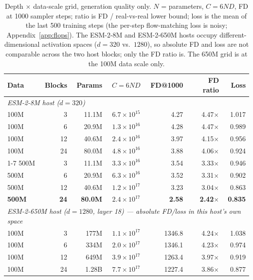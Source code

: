 \documentclass{article}
\begin{document}
\begin{table}[t]
\centering
\caption{Depth $\times$ data-scale grid, generation quality only. $N$ = parameters,
$C = 6ND$, FD at 1000 sampler steps; ratio is FD / real-vs-real lower bound; loss is the
mean of the last 500 training steps (the per-step flow-matching loss is noisy;
Appendix~\ref{app:flops}). The ESM-2-8M and ESM-2-650M hosts occupy different-dimensional
activation spaces ($d{=}320$ vs.\ $1280$), so absolute FD and loss are not comparable across
the two host blocks; only the FD ratio is. The 650M grid is at the 100M data scale only.}
\label{tab:scaling}
\begin{tabular}{lrrrrrr}
\toprule
Data & Blocks & Params & $C = 6ND$ & FD@1000 & FD ratio & Loss \\
\midrule
\multicolumn{7}{l}{\emph{ESM-2-8M host ($d{=}320$)}} \\
100M & 3  & 11.1M & $6.7{\times}10^{15}$ & 4.27 & 4.47$\times$ & 1.017 \\
100M & 6  & 20.9M & $1.3{\times}10^{16}$ & 4.28 & 4.47$\times$ & 0.989 \\
100M & 12 & 40.6M & $2.4{\times}10^{16}$ & 3.97 & 4.15$\times$ & 0.956 \\
100M & 24 & 80.0M & $4.8{\times}10^{16}$ & 3.88 & 4.06$\times$ & 0.924 \\
\cmidrule(l){1-7}
500M & 3  & 11.1M & $3.3{\times}10^{16}$ & 3.54 & 3.33$\times$ & 0.946 \\
500M & 6  & 20.9M & $6.3{\times}10^{16}$ & 3.52 & 3.31$\times$ & 0.902 \\
500M & 12 & 40.6M & $1.2{\times}10^{17}$ & 3.23 & 3.04$\times$ & 0.863 \\
\textbf{500M} & \textbf{24} & \textbf{80.0M} & $2.4{\times}10^{17}$ & \textbf{2.58} & \textbf{2.42$\times$} & \textbf{0.835} \\
\midrule
\multicolumn{7}{l}{\emph{ESM-2-650M host ($d{=}1280$, layer 18) --- absolute FD/loss in this host's own space}} \\
100M & 3  & 177M  & $1.1{\times}10^{17}$ & 1346.8 & 4.24$\times$ & 1.038 \\
100M & 6  & 334M  & $2.0{\times}10^{17}$ & 1346.1 & 4.23$\times$ & 0.974 \\
100M & 12 & 649M  & $3.9{\times}10^{17}$ & 1263.4 & 3.97$\times$ & 0.919 \\
100M & 24 & 1.28B & $7.7{\times}10^{17}$ & 1227.4 & 3.86$\times$ & 0.877 \\
\bottomrule
\end{tabular}
\end{table}
\end{document}
